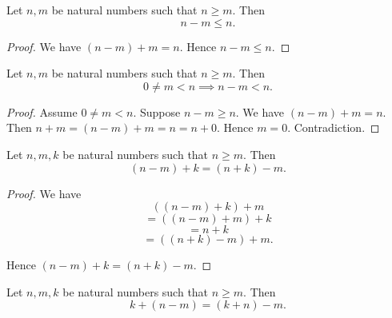 \documentclass[../arithmetic.tex]{subfiles}
\begin{document}
  \begin{forthel}
    \begin{proposition}
      Let $n, m$ be natural numbers such that $n \geq m$.
      Then \[ n \minus m \leq n. \]
    \end{proposition}
    \begin{proof}
      We have $(n \minus m) \plus m = n$.
      Hence $n \minus m \leq n$.
    \end{proof}
  \end{forthel}

  \begin{forthel}
    \begin{proposition}
      Let $n, m$ be natural numbers such that $n \geq m$.
      Then \[ 0 \neq m \less n \implies n \minus m \less n. \]
    \end{proposition}
    \begin{proof}
      Assume $0 \neq m \less n$.
      Suppose $n \minus m \geq n$.
      We have $(n \minus m) \plus m = n$.
      Then $n \plus m
        = (n \minus m) \plus m
        = n
        = n \plus 0$.
      Hence $m = 0$.
      Contradiction.
    \end{proof}
  \end{forthel}

  \begin{forthel}
    \begin{proposition}
      Let $n, m, k$ be natural numbers such that $n \geq m$.
      Then \[ (n \minus m) \plus k = (n \plus k) \minus m. \]
    \end{proposition}
    \begin{proof}
      We have
      \[  ((n \minus m) \plus k) \plus m       \]
      \[    = ((n \minus m) \plus m) \plus k   \]
      \[    = n \plus k               \]
      \[    = ((n \plus k) \minus m) \plus m.  \]

      Hence $(n \minus m) \plus k = (n \plus k) \minus m$.
    \end{proof}
  \end{forthel}

  \begin{forthel}
    \begin{corollary}
      Let $n, m, k$ be natural numbers such that $n \geq m$.
      Then \[ k \plus (n \minus m) = (k \plus n) \minus m. \]
    \end{corollary}
  \end{forthel}
\end{document}
